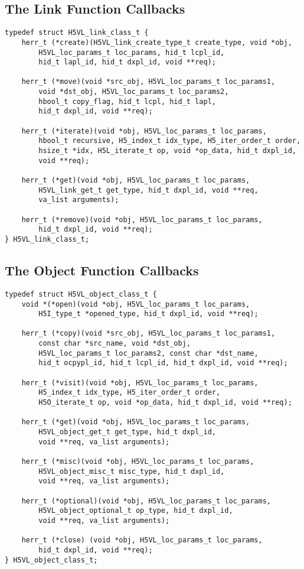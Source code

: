 \subsection{The Link Function Callbacks}
\begin{lstlisting}
typedef struct H5VL_link_class_t {
    herr_t (*create)(H5VL_link_create_type_t create_type, void *obj,
        H5VL_loc_params_t loc_params, hid_t lcpl_id, 
        hid_t lapl_id, hid_t dxpl_id, void **req);

    herr_t (*move)(void *src_obj, H5VL_loc_params_t loc_params1,
        void *dst_obj, H5VL_loc_params_t loc_params2,
        hbool_t copy_flag, hid_t lcpl, hid_t lapl, 
        hid_t dxpl_id, void **req);

    herr_t (*iterate)(void *obj, H5VL_loc_params_t loc_params, 
        hbool_t recursive, H5_index_t idx_type, H5_iter_order_t order, 
        hsize_t *idx, H5L_iterate_t op, void *op_data, hid_t dxpl_id, 
        void **req);

    herr_t (*get)(void *obj, H5VL_loc_params_t loc_params, 
        H5VL_link_get_t get_type, hid_t dxpl_id, void **req, 
        va_list arguments);

    herr_t (*remove)(void *obj, H5VL_loc_params_t loc_params, 
        hid_t dxpl_id, void **req);
} H5VL_link_class_t;
\end{lstlisting}

\subsection{The Object Function Callbacks}

\begin{lstlisting}
typedef struct H5VL_object_class_t {
    void *(*open)(void *obj, H5VL_loc_params_t loc_params, 
        H5I_type_t *opened_type, hid_t dxpl_id, void **req);

    herr_t (*copy)(void *src_obj, H5VL_loc_params_t loc_params1, 
        const char *src_name, void *dst_obj, 
        H5VL_loc_params_t loc_params2, const char *dst_name,
        hid_t ocpypl_id, hid_t lcpl_id, hid_t dxpl_id, void **req);

    herr_t (*visit)(void *obj, H5VL_loc_params_t loc_params, 
        H5_index_t idx_type, H5_iter_order_t order, 
        H5O_iterate_t op, void *op_data, hid_t dxpl_id, void **req);

    herr_t (*get)(void *obj, H5VL_loc_params_t loc_params, 
        H5VL_object_get_t get_type, hid_t dxpl_id, 
        void **req, va_list arguments);

    herr_t (*misc)(void *obj, H5VL_loc_params_t loc_params, 
        H5VL_object_misc_t misc_type, hid_t dxpl_id, 
        void **req, va_list arguments);

    herr_t (*optional)(void *obj, H5VL_loc_params_t loc_params, 
        H5VL_object_optional_t op_type, hid_t dxpl_id, 
        void **req, va_list arguments);

    herr_t (*close) (void *obj, H5VL_loc_params_t loc_params, 
        hid_t dxpl_id, void **req);
} H5VL_object_class_t;
\end{lstlisting}

